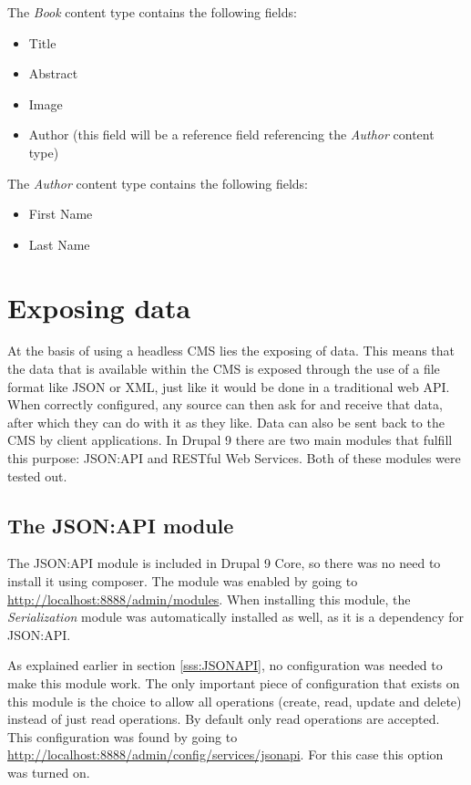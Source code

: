 The \emph{Book} content type contains the following fields: 

\begin{itemize}
	\item Title
	\item Abstract
	\item Image
	\item Author (this field will be a reference field referencing the \emph{Author} content type)
\end{itemize}

The \emph{Author} content type contains the following fields:

\begin{itemize}
	\item First Name
	\item Last Name
\end{itemize}

\section{Exposing data}

At the basis of using a headless CMS lies the exposing of data. This means that the data that is available within the CMS is exposed through the use of a file format like JSON or XML, just like it would be done in a traditional web API. When correctly configured, any source can then ask for and receive that data, after which they can do with it as they like. Data can also be sent back to the CMS by client applications. In Drupal 9 there are two main modules that fulfill this purpose: JSON:API and RESTful Web Services. Both of these modules were tested out.

\subsection{The JSON:API module}

The JSON:API module is included in Drupal 9 Core, so there was no need to install it using composer. The module was enabled by going to \url{http://localhost:8888/admin/modules}. When installing this module, the \emph{Serialization} module was automatically installed as well, as it is a dependency for JSON:API.

As explained earlier in section \ref{sss:JSONAPI}, no configuration was needed to make this module work. The only important piece of configuration that exists on this module is the choice to allow all operations (create, read, update and delete) instead of just read operations. By default only read operations are accepted. This configuration was found by going to \url{http://localhost:8888/admin/config/services/jsonapi}. For this case this option was turned on.

